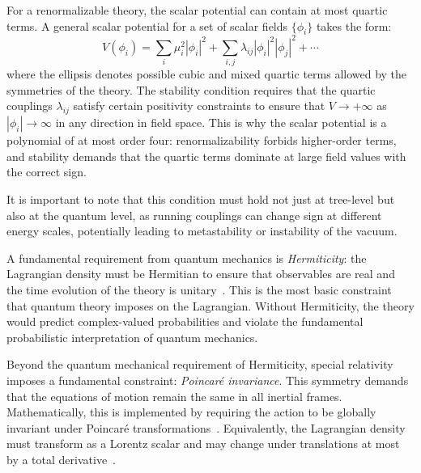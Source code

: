 For a renormalizable theory, the scalar potential can contain at most quartic terms. A general scalar potential for a set of scalar fields $\{\phi_i\}$ takes the form:
\begin{equation}
    V(\phi_i) = \sum_i \mu_i^2 |\phi_i|^2 + \sum_{i,j} \lambda_{ij} |\phi_i|^2 |\phi_j|^2 + \cdots
\end{equation}
where the ellipsis denotes possible cubic and mixed quartic terms allowed by the symmetries of the theory. The stability condition requires that the quartic couplings $\lambda_{ij}$ satisfy certain positivity constraints to ensure that $V \to +\infty$ as $|\phi_i| \to \infty$ in any direction in field space. This is why the scalar potential is a polynomial of at most order four: renormalizability forbids higher-order terms, and stability demands that the quartic terms dominate at large field values with the correct sign.

It is important to note that this condition must hold not just at tree-level but also at the quantum level, as running couplings can change sign at different energy scales, potentially leading to metastability or instability of the vacuum.

A fundamental requirement from quantum mechanics is \textit{Hermiticity}: the Lagrangian density must be Hermitian to ensure that observables are real and the time evolution of the theory is unitary~\parencite{pall,peskin}. This is the most basic constraint that quantum theory imposes on the Lagrangian. Without Hermiticity, the theory would predict complex-valued probabilities and violate the fundamental probabilistic interpretation of quantum mechanics.

Beyond the quantum mechanical requirement of Hermiticity, special relativity imposes a fundamental constraint: \textit{Poincaré invariance}. This symmetry demands that the equations of motion remain the same in all inertial frames. Mathematically, this is implemented by requiring the action to be globally invariant under Poincaré transformations~\parencite{pall}. Equivalently, the Lagrangian density must transform as a Lorentz scalar and may change under translations at most by a total derivative~\parencite{jose1998classical}.

